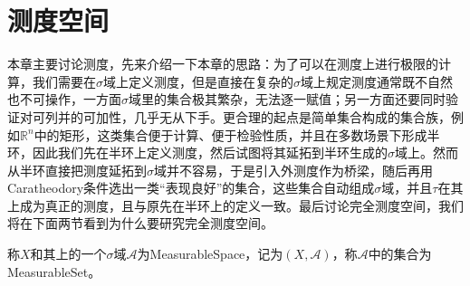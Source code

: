 \section{测度空间}
本章主要讨论测度，先来介绍一下本章的思路：为了可以在测度上进行极限的计算，我们需要在$\sigma$域上定义测度，但是直接在复杂的$\sigma$域上规定测度通常既不自然也不可操作，一方面$\sigma$域里的集合极其繁杂，无法逐一赋值；另一方面还要同时验证对可列并的可加性，几乎无从下手。更合理的起点是简单集合构成的集合族，例如$\mathbb{R}^{n}$中的矩形，这类集合便于计算、便于检验性质，并且在多数场景下形成半环，因此我们先在半环上定义测度，然后试图将其延拓到半环生成的$\sigma$域上。然而从半环直接把测度延拓到$\sigma$域并不容易，于是引入外测度作为桥梁，随后再用Caratheodory条件选出一类“表现良好”的集合，这些集合自动组成$\sigma$域，并且$\tau$在其上成为真正的测度，且与原先在半环上的定义一致。最后讨论完全测度空间，我们将在下面两节看到为什么要研究完全测度空间。
\begin{definition}
	称$X$和其上的一个$\sigma$域$\mathscr{A}$为\gls{MeasurableSpace}，记为$(X,\mathscr{A})$，称$\mathscr{A}$中的集合为\gls{MeasurableSet}。
\end{definition}
